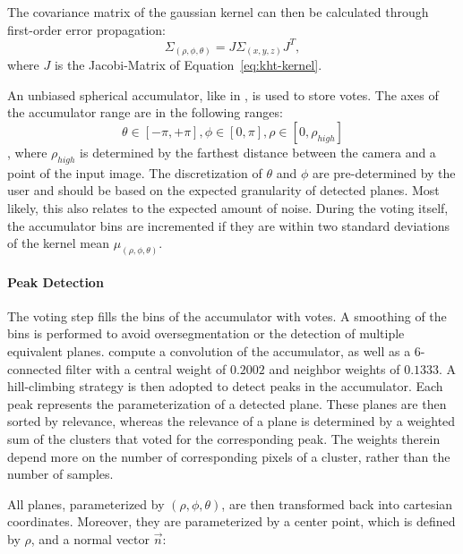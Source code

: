 \documentclass[main.tex]{subfiles}
\begin{document}
The covariance matrix of the gaussian kernel can then be calculated through first-order error propagation:
\begin{equation}
    \Sigma_{(\rho,\phi,\theta)} = J\Sigma_{(x,y,z)}J^T,
\end{equation}
where $J$ is the Jacobi-Matrix of Equation~\ref{eq:kht-kernel}.

An unbiased spherical accumulator, like in \cite{Borrmann_Elseberg_Lingemann_Nüchter_2011}, is used to store votes.
The axes of the accumulator range are in the following ranges:
$$\theta \in [-\pi , +\pi], \phi \in [0, \pi], \rho \in [0, \rho_{high}]$$,
where $\rho_{high}$ is determined by the farthest distance between the camera and a point of the input image.
The discretization of $\theta$ and $\phi$ are pre-determined by the user and should be based on the expected
granularity of detected planes. Most likely, this also relates to the expected amount of noise.
During the voting itself, the accumulator bins are incremented if they are within two standard deviations of the
kernel mean $\mu_{(\rho,\phi,\theta)}$.

\paragraph{Peak Detection}
The voting step fills the bins of the accumulator with votes. A smoothing of the bins is performed to avoid
oversegmentation or the detection of multiple equivalent planes.
\citeauthor{Vera_Lucio_Fernandes_Velho_2018}\cite[Section~3.5]{Vera_Lucio_Fernandes_Velho_2018} compute a convolution of the
accumulator, as well as a 6-connected filter with a central weight of $0.2002$ and neighbor weights of $0.1333$.
A hill-climbing strategy is then adopted to detect peaks in the accumulator. Each peak represents the
parameterization of a detected plane. These planes are then sorted by relevance, whereas the relevance of a plane
is determined by a weighted sum of the clusters that voted for the corresponding peak. The weights therein
depend more on the number of corresponding pixels of a cluster, rather than the number of samples.

All planes, parameterized by $(\rho,\phi,\theta)$, are then transformed back into cartesian coordinates.
Moreover, they are parameterized by a center point, which is defined by $\rho$, and a normal vector $\overrightarrow{n}$:
\def\C{
    \begin{pmatrix}
        n_x \\
        n_y \\
        n_z
    \end{pmatrix}
}
\def\D{
    \begin{pmatrix}
        \sin\phi\cos\theta \\
        \sin\phi\sin\theta \\
        \cos\phi
    \end{pmatrix}
}
\end{document}
